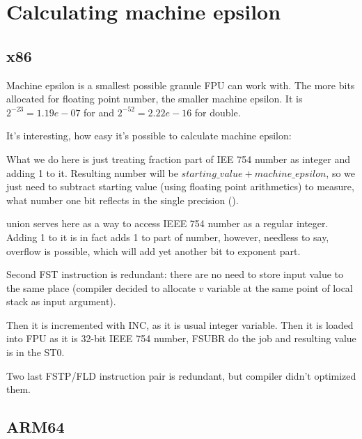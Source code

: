 ﻿\ifdefined\RUSSIAN
\else
\section{Calculating machine epsilon}

\subsection{x86}

Machine epsilon is a smallest possible granule \ac{FPU} can work with.
The more bits allocated for floating point number, the smaller machine epsilon.
It is $2^{-23} = 1.19e-07$ for \Tfloat and $2^{-52} = 2.22e-16$ for double.

It's interesting, how easy it's possible to calculate machine epsilon:



What we do here is just treating fraction part of IEE 754 number as integer and adding 1 to it.
Resulting number will be $starting\_value+machine\_epsilon$, so we just need to subtract
starting value (using floating point arithmetics) to measure, what number one bit reflects
in the single precision (\Tfloat).

union serves here as a way to access IEEE 754 number as a regular integer.
Adding 1 to it is in fact adds 1 to  part of number, however, needless to say,
overflow is possible, which will add yet another bit to exponent part.



Second FST instruction is redundant: there are no need to store input value to the same
place (compiler decided to allocate $v$ variable at the same point of local stack as input 
argument).

Then it is incremented with INC, as it is usual integer variable.
Then it is loaded into FPU as it is 32-bit IEEE 754 number, FSUBR do the job and resulting
value is in the ST0.

Two last FSTP/FLD instruction pair is redundant, but compiler didn't optimized them.

\subsection{ARM64}

